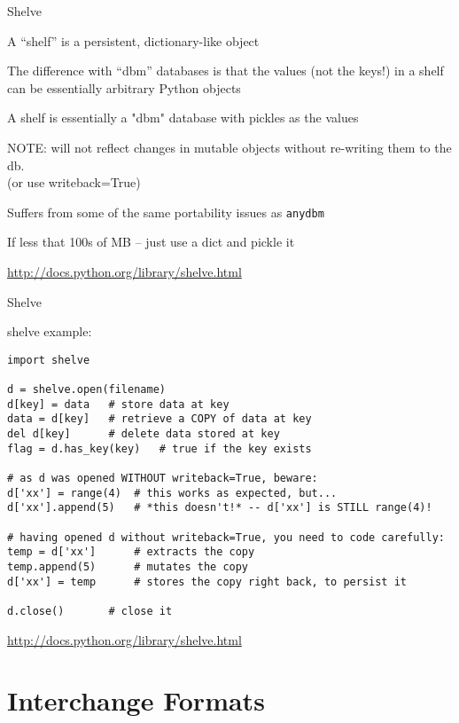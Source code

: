 \documentclass{beamer}
\begin{document}
\begin{frame}[fragile]{Shelve}

\vfill
{\Large A “shelf” is a persistent, dictionary-like object}

\vfill
{\Large The difference with “dbm” databases is that the values (not the keys!)
in a shelf can be essentially arbitrary Python objects}

\vfill
{\Large A shelf is essentially a "dbm" database with pickles as the values}

\vfill
{\Large NOTE: will not reflect changes in mutable objects without
   re-writing them to the db.}\\
   (or use writeback=True)

\vfill
{\Large Suffers from some of the same portability issues as \verb|anydbm|}

\vfill
{\Large If less that 100s of MB -- just use a dict and pickle it}

\vfill
\url{http://docs.python.org/library/shelve.html}
\end{frame} 

\begin{frame}[fragile]{Shelve}

\vfill
{\Large shelve example:}

\begin{verbatim}
import shelve

d = shelve.open(filename) 
d[key] = data   # store data at key 
data = d[key]   # retrieve a COPY of data at key 
del d[key]      # delete data stored at key 
flag = d.has_key(key)   # true if the key exists

# as d was opened WITHOUT writeback=True, beware:
d['xx'] = range(4)  # this works as expected, but...
d['xx'].append(5)   # *this doesn't!* -- d['xx'] is STILL range(4)!

# having opened d without writeback=True, you need to code carefully:
temp = d['xx']      # extracts the copy
temp.append(5)      # mutates the copy
d['xx'] = temp      # stores the copy right back, to persist it

d.close()       # close it
\end{verbatim}

\vfill
\url{http://docs.python.org/library/shelve.html}
\end{frame} 


\section{Interchange Formats} 
\end{document}
